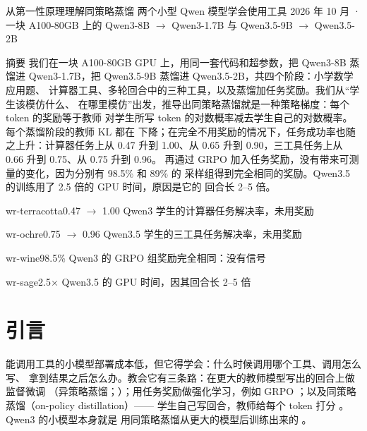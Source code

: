 \documentclass[11pt,a4paper,fontset=none]{ctexart}
\begin{document}
  {从第一性原理理解同策略蒸馏}
  {两个小型 Qwen 模型学会使用工具}
  {2026 年 10 月 · 一块 A100-80GB 上的 Qwen3-8B $\to$ Qwen3-1.7B 与
  Qwen3.5-9B $\to$ Qwen3.5-2B}

\begin{wrabstract}{摘要}
我们在一块 A100-80GB GPU 上，用同一套代码和超参数，把 Qwen3-8B 蒸馏进
Qwen3-1.7B，把 Qwen3.5-9B 蒸馏进 Qwen3.5-2B，共四个阶段：小学数学应用题、
计算器工具、多轮回合中的三种工具，以及蒸馏加任务奖励。我们从“学生该模仿什么、
在哪里模仿”出发，推导出同策略蒸馏就是一种策略梯度：每个 token 的奖励等于教师
对学生所写 token 的对数概率减去学生自己的对数概率。每个蒸馏阶段的教师 KL 都在
下降；在完全不用奖励的情况下，任务成功率也随之上升：计算器任务上从 0.47 升到
1.00、从 0.65 升到 0.90，三工具任务上从 0.66 升到 0.75、从 0.75 升到 0.96。
再通过 GRPO 加入任务奖励，没有带来可测量的变化，因为分别有 98.5\% 和 89\% 的
采样组得到完全相同的奖励。Qwen3.5 的训练用了 2.5 倍的 GPU 时间，原因是它的
回合长 2--5 倍。
\end{wrabstract}

\begin{tcbraster}[raster columns=4, raster equal height,
    raster column skip=3mm]
\begin{stat}{wr-terracotta}{0.47 $\to$ 1.00}
Qwen3 学生的计算器任务解决率，未用奖励
\end{stat}
\begin{stat}{wr-ochre}{0.75 $\to$ 0.96}
Qwen3.5 学生的三工具任务解决率，未用奖励
\end{stat}
\begin{stat}{wr-wine}{98.5\%}
Qwen3 的 GRPO 组奖励完全相同：没有信号
\end{stat}
\begin{stat}{wr-sage}{2.5$\times$}
Qwen3.5 的 GPU 时间，因其回合长 2--5 倍
\end{stat}
\end{tcbraster}

\section{引言}

能调用工具的小模型部署成本低，但它得学会：什么时候调用哪个工具、调用怎么写、
拿到结果之后怎么办。教会它有三条路：在更大的教师模型写出的回合上做监督微调
（异策略蒸馏；\citealp{kim2016seqkd}）；用任务奖励做强化学习，例如 GRPO
\citep{shao2024deepseekmath}；以及同策略蒸馏（on-policy distillation）——
学生自己写回合，教师给每个 token 打分
\citep{agarwal2024gkd,gu2024minillm,lu2025onpolicy}。Qwen3 的小模型本身就是
用同策略蒸馏从更大的模型后训练出来的 \citep{yang2025qwen3}。
\end{document}
